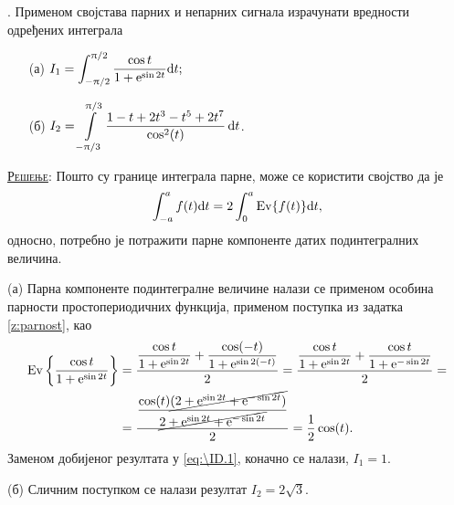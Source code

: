 \textbf{\ID}. 
Применом својстава парних и непарних 
сигнала
израчунати вредности 
одређених интеграла 
\begin{multicols}{2}
\begin{enumerate}

\item[(а)]
$\displaystyle 
I_1 = 
\int_{-\uppi/2}^{\uppi/2}
\dfrac{\cos t}{1 + {\rm e}^{\sin 2t}}
 {\rm d} t;
$

\item[(б)]
$\displaystyle
I_2 = \int\limits_{-\uppi/3}^{\uppi/3}
\dfrac{1 - t + 2t^3 - t^5 + 2t^7}{\cos^2 (t)}\,{\rm d} t$.
\end{enumerate}
\end{multicols}

\textsc{\underline{Решење}}:
Пошто су границе интеграла парне, може се користити својство да је 
\begin{equation}
\displaystyle \int_{-a}^{a} f(t) \de t = 2\int_{0}^{a} {\rm Ev}\{f(t)\} \de t, \label{eq:\ID.1}
\end{equation}
односно, потребно је потражити парне компоненте датих подинтегралних величина. 

(а) Парна компоненте подинтегралне величине налази се применом особина парности простопериодичних функција, 
применом поступка из задатка \ref{z:parnost}, као 
\begin{eqnarray}
    {\rm Ev}\left\{  
        \dfrac{\cos t}{1 + {\rm e}^{\sin 2t}}
    \right\}
    &= \dfrac{
        \dfrac{\cos t}{1 + {\rm e}^{\sin 2t}} + \dfrac{\cos (-t)}{1 + {\rm e}^{\sin 2(-t)}}
    }{2}
    =
    \dfrac{
        \dfrac{\cos t}{1 + {\rm e}^{\sin 2t}} + \dfrac{\cos t}{1 + {\rm e}^{-\sin 2t}}
    }{2}
    =  \\
    &= \dfrac{ \dfrac{\cos(t) \cancel{( 2 + {\rm e}^{\sin 2t} + {\rm e}^{-\sin 2t} )} } { \cancel{2 + {\rm e}^{\sin 2t} + {\rm e}^{-\sin 2t}} } }{2}
    = \dfrac{1}{2} \cos(t).
\end{eqnarray}
Заменом добијеног резултата у \eqref{eq:\ID.1}, коначно се налази, $I_1 = 1$.

(б) Сличним поступком се налази резултат $I_2 = 2\sqrt 3$.

